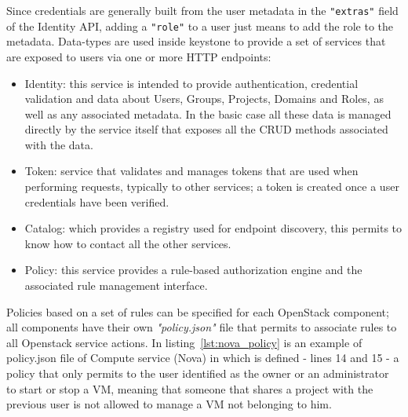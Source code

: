 Since credentials are generally built from the user metadata in the \texttt{"extras"} field of the Identity API, adding a \texttt{"role"} to a user just means to add the role to the metadata.
Data-types are used inside keystone to provide a set of services that are exposed to users via one or more HTTP endpoints:
\begin{itemize}
	\item Identity: this service is intended to provide authentication, credential validation and data about Users, Groups, Projects, Domains and Roles, as well as any associated metadata. In the basic case all these data is managed directly by the service itself that exposes all the CRUD methods associated with the data.
	\item Token: service that validates and manages tokens that are used when performing requests, typically to other services; a token is created once a user credentials have been verified.
	\item Catalog: which provides a registry used for endpoint discovery, this permits to know how to contact all the other services.
	\item Policy: this service provides a rule-based authorization engine and the associated rule management interface.
\end{itemize}
Policies based on a set of rules can be specified for each OpenStack component; all components have their own \textit{"policy.json"} file that permits to associate rules to all Openstack service actions. In listing~\ref{lst:nova_policy} is an example of policy.json file of Compute service (Nova) in which is defined - lines 14 and 15 - a policy that only permits to the user identified as the owner or an administrator to start or stop a VM, meaning that someone that shares a project with the previous user is not allowed to manage a VM not belonging to him.



